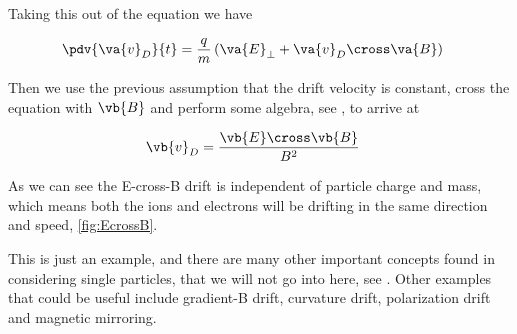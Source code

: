 	Taking this out of the equation we have

	\begin{align}
		\pdv{\va{v}_D}{t} &= \frac{q}{m} \left( \va{E}_\perp + \va{v}_D \cross \va{B} \right)
	\end{align}

	Then we use the previous assumption that the drift velocity is constant,
	cross the equation with \(\vb{B}\) and perform some algebra, see \citet{goldston_introduction_1995},
	to arrive at

	\begin{align}
		\vb{v}_D &= \frac{\vb{E}\cross\vb{B}}{B^2}
	\end{align}

	As we can see the E-cross-B drift is independent of particle charge and mass,
	which means both the ions and electrons will be drifting in the same direction and
	speed, \cref{fig:EcrossB}.

	This is just an example, and there are many other important concepts found in
	considering single particles, that we will not go into here, see \citet{goldston_introduction_1995}.
	Other examples that could be useful include gradient-B drift, curvature drift,
	polarization drift and magnetic mirroring.
